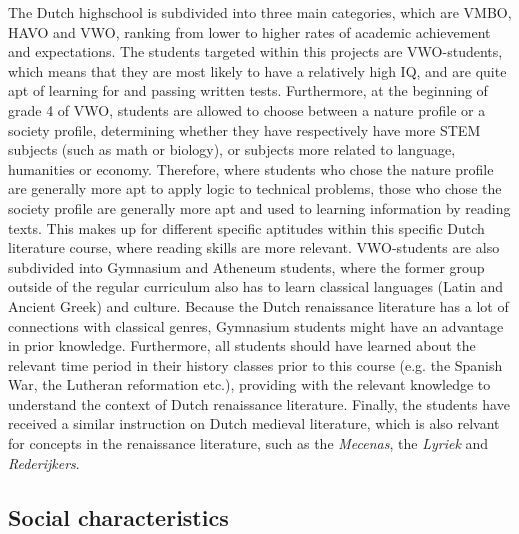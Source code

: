 The Dutch highschool is subdivided into three main categories, which are VMBO, HAVO and VWO, ranking from lower to higher rates of academic achievement and expectations. The students targeted within this projects are VWO-students, which means that they are most likely to have a relatively high IQ, and are quite apt of learning for and passing written tests. Furthermore, at the beginning of grade 4 of VWO, students are allowed to choose between a nature profile or a society profile, determining whether they have respectively have more STEM subjects (such as math or biology), or subjects more related to language, humanities or economy. Therefore, where students who chose the nature profile are generally more apt to apply logic to technical problems, those who chose the society profile are generally more apt and used to learning information by reading texts. This makes up for different specific aptitudes within this specific Dutch literature course, where reading skills are more relevant. VWO-students are also subdivided into Gymnasium and Atheneum students, where the former group outside of the regular curriculum also has to learn classical languages (Latin and Ancient Greek) and culture. Because the Dutch renaissance literature has a lot of connections with classical genres, Gymnasium students might have an advantage in prior knowledge. Furthermore, all students should have learned about the relevant time period in their history classes prior to this course (e.g. the Spanish War, the Lutheran reformation etc.), providing with the relevant knowledge to understand the context of Dutch renaissance literature. Finally, the students have received a similar instruction on Dutch medieval literature, which is also relvant for concepts in the renaissance literature, such as the \emph{Mecenas}, the \emph{Lyriek} and \emph{Rederijkers}.

\subsection{Social characteristics}

